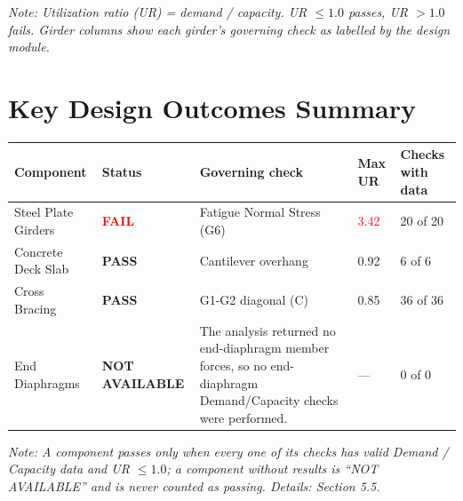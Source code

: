 \documentclass[12pt,a4paper]{report}
\numberwithin{table}{chapter}
\numberwithin{figure}{chapter}
\begin{document}
\vspace{0.4em}
\noindent\textit{Note: Utilization ratio (UR) = demand / capacity. UR $\leq 1.0$ passes, UR $> 1.0$ fails. Girder columns show each girder's governing check as labelled by the design module.}

\vspace{1em}

\section*{Key Design Outcomes Summary}
\label{sec:key-outcomes}

\noindent\begin{tabular}{|L{3.01cm}|C{2.12cm}|L{5.32cm}|C{1.24cm}|C{1.95cm}|}
\hline
{}\textbf{Component} & \textbf{Status} & \textbf{Governing check} & \textbf{Max UR} & \textbf{Checks with data} \\
\hline
Steel Plate Girders & \textcolor{red}{\textbf{FAIL}} & Fatigue Normal Stress (G6) & \textcolor{red}{3.42} & 20 of 20 \\
\hline
Concrete Deck Slab & \textbf{PASS} & Cantilever overhang & 0.92 & 6 of 6 \\
\hline
Cross Bracing & \textbf{PASS} & G1-G2 diagonal (C) & 0.85 & 36 of 36 \\
\hline
End Diaphragms & \textbf{NOT AVAILABLE} & The analysis returned no end-diaphragm member forces, so no end-diaphragm Demand/Capacity checks were performed. & --- & 0 of 0 \\
\hline
\end{tabular}

\vspace{0.4em}
\noindent\textit{Note: A component passes only when every one of its checks has valid Demand / Capacity data and UR $\leq 1.0$; a component without results is ``NOT AVAILABLE'' and is never counted as passing. Details: Section 5.5.}
\end{document}

